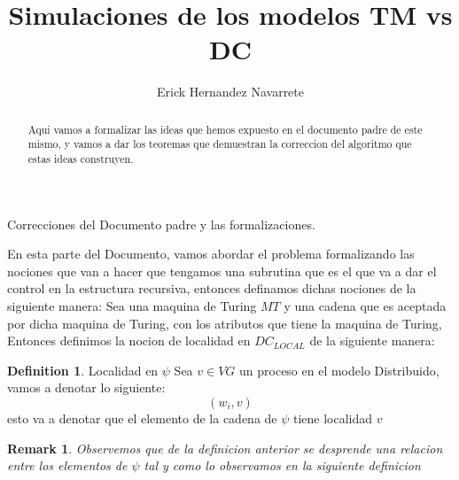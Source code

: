 \documentclass[11pt]{article}
\author{Erick Hernandez Navarrete}
\title{Simulaciones de los modelos TM vs DC}
\newtheorem*{remark}{Remark}
\theoremstyle{definition}
\newtheorem{definition}{Definition}[section]
\begin{document}
    \begin{titlepage}
        \begin{large}
            Correcciones del Documento padre y las formalizaciones.
        \end{large}
    \end{titlepage}

    \begin{abstract}
        Aqui vamos a formalizar las ideas que hemos expuesto en el documento
        padre de este mismo, y vamos a dar los teoremas que demuestran la correccion del
        algoritmo que estas ideas construyen.
    \end{abstract}
    \newline
    En esta parte del Documento, vamos abordar el problema formalizando las nociones
    que van a hacer que tengamos una subrutina que es el que va a dar el control en
    la estructura recursiva, entonces definamos dichas nociones de la siguiente manera:
    \space
    Sea una maquina de Turing $MT$ y una cadena que es aceptada por dicha maquina de Turing, con los atributos que tiene la maquina de Turing,
    Entonces definimos la nocion de localidad en $DC_{LOCAL}$ de la siguiente manera:
    \begin{definition}{Localidad en $\psi$}
        Sea $v \in VG$ un proceso en el modelo Distribuido,
        vamos a denotar lo siguiente:
        \begin{equation}
            (w_{i},v)
        \end{equation}
        esto va a denotar que el elemento de la cadena de $\psi$ tiene localidad $v$
    \end{definition}

    \begin{remark}
        Observemos que de la definicion anterior se desprende una relacion entre los elementos
        de $\psi$ tal y como lo observamos en la siguiente definicion
    \end{remark}
\end{document}
